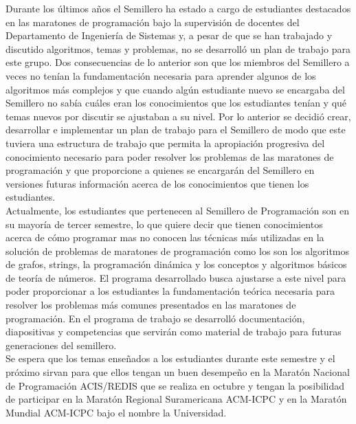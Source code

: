 \documentclass[conference]{IEEEtran}
\begin{document}
Durante los últimos años el Semillero ha estado a cargo de estudiantes destacados en las maratones de programación bajo la supervisión de docentes del Departamento de Ingeniería de Sistemas y, a pesar de que se han trabajado y discutido algoritmos, temas y problemas, no se desarrolló un plan de trabajo para este grupo. Dos consecuencias de lo anterior son que los miembros del Semillero a veces no tenían la fundamentación necesaria para aprender algunos de los algoritmos más complejos y que cuando algún estudiante nuevo se encargaba del Semillero no sabía cuáles eran los conocimientos que los estudiantes tenían y qué temas nuevos por discutir se ajustaban a su nivel. Por lo anterior se decidió crear, desarrollar e implementar un plan de trabajo para el Semillero de modo que este tuviera una estructura de trabajo que permita la apropiación progresiva del conocimiento necesario para poder resolver los problemas de las maratones de programación y que proporcione a quienes se encargarán del Semillero en versiones futuras información acerca de los conocimientos que tienen los estudiantes.\\
Actualmente, los estudiantes que pertenecen al Semillero de Programación son en su mayoría de tercer semestre, lo que quiere decir que tienen conocimientos acerca de cómo programar mas no conocen las técnicas más utilizadas en la solución de problemas de maratones de programación como los son los algoritmos de grafos, strings, la programación dinámica y los conceptos y algoritmos básicos de teoría de números. El programa desarrollado busca ajustarse a este nivel para poder proporcionar a los estudiantes la fundamentación teórica necesaria para resolver los problemas más comunes presentados en las maratones de programación. En el programa de trabajo se desarrolló documentación, diapositivas y competencias que servirán como material de trabajo para futuras generaciones del semillero.\\
Se espera que los temas enseñados a los estudiantes durante este semestre y el próximo sirvan para que ellos tengan un buen desempeño en la Maratón Nacional de Programación ACIS/REDIS que se realiza en octubre y tengan la posibilidad de participar en la Maratón Regional Suramericana ACM-ICPC y en la Maratón Mundial ACM-ICPC bajo el nombre la Universidad.
\end{document}

